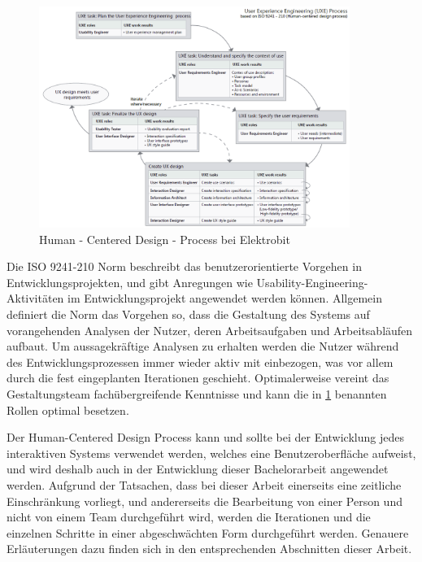 \begin{figure}
\begin{center}
  \includegraphics[width=0.9\textwidth]{figures/HCD.png}
  \caption{Human - Centered Design - Process bei Elektrobit}
  \label{fig:HCD}
\end{center}
\end{figure}

Die ISO 9241-210 Norm beschreibt das benutzerorientierte Vorgehen in Entwicklungsprojekten, und gibt Anregungen wie Usability-Engineering-Aktivitäten im Entwicklungsprojekt angewendet werden können.
Allgemein definiert die Norm das Vorgehen so, dass die Gestaltung des Systems auf vorangehenden Analysen der Nutzer, deren Arbeitsaufgaben und Arbeitsabläufen aufbaut.
Um aussagekräftige Analysen zu erhalten werden die Nutzer während des Entwicklungsprozessen immer wieder aktiv mit einbezogen, was vor allem durch die fest eingeplanten Iterationen geschieht.
Optimalerweise vereint das Gestaltungsteam fachübergreifende Kenntnisse und kann die in \cref{fig:HCD} benannten Rollen optimal besetzen\cite{.d}.

Der Human-Centered Design Process kann und sollte bei der Entwicklung jedes interaktiven Systems verwendet werden, welches eine Benutzeroberfläche aufweist, und wird deshalb auch in der Entwicklung dieser Bachelorarbeit angewendet werden.
Aufgrund der Tatsachen, dass bei dieser Arbeit einerseits eine zeitliche Einschränkung vorliegt, und andererseits die Bearbeitung von einer Person und nicht von einem Team durchgeführt wird, werden die Iterationen und die einzelnen Schritte in einer abgeschwächten Form durchgeführt werden. Genauere Erläuterungen dazu finden sich in den entsprechenden Abschnitten dieser Arbeit.

